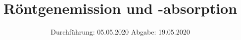 

\subject{V602}
\title{Röntgenemission und -absorption}
\date{%
  Durchführung: 05.05.2020
  \hspace{3em}
  Abgabe: 19.05.2020
}



\maketitle
\thispagestyle{empty}
\tableofcontents
\newpage








\printbibliography{}


